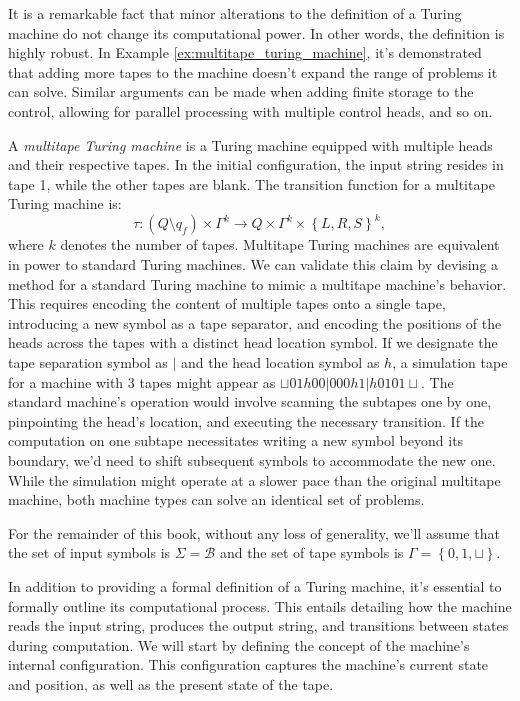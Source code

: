 It is a remarkable fact that minor alterations to the definition of a Turing machine do not change its computational power. In other words, the definition is highly robust. In Example \ref{ex:multitape_turing_machine}, it's demonstrated that adding more tapes to the machine doesn't expand the range of problems it can solve. Similar arguments can be made when adding finite storage to the control, allowing for parallel processing with multiple control heads, and so on.

\begin{example}
\label{ex:multitape_turing_machine}
A \emph{multitape Turing machine} is a Turing machine equipped with multiple heads and their respective tapes. In the initial configuration, the input string resides in tape 1, while the other tapes are blank. The transition function for a multitape Turing machine is:
\[
\tau:\left(Q \setminus q_{f} \right) \times \Gamma^k \rightarrow  Q \times \Gamma^k \times \left\{L,R,S\right\}^k,
\]
where $k$ denotes the number of tapes. Multitape Turing machines are equivalent in power to standard Turing machines. We can validate this claim by devising a method for a standard Turing machine to mimic a multitape machine's behavior. This requires encoding the content of multiple tapes onto a single tape, introducing a new symbol as a tape separator, and encoding the positions of the heads across the tapes with a distinct head location symbol. If we designate the tape separation symbol as $|$ and the head location symbol as $h$, a simulation tape for a machine with 3 tapes might appear as $\sqcup01h00|000h1|h0101\sqcup$. The standard machine's operation would involve scanning the subtapes one by one, pinpointing the head's location, and executing the necessary transition. If the computation on one subtape necessitates writing a new symbol beyond its boundary, we'd need to shift subsequent symbols to accommodate the new one. While the simulation might operate at a slower pace than the original multitape machine, both machine types can solve an identical set of problems.
\end{example}

For the remainder of this book, without any loss of generality, we'll assume that the set of input symbols is $\Sigma = \mathcal{B}$ and the set of tape symbols is $\Gamma = \left\{0, 1, \sqcup \right\}$.

In addition to providing a formal definition of a Turing machine, it's essential to formally outline its computational process. This entails detailing how the machine reads the input string, produces the output string, and transitions between states during computation. We will start by defining the concept of the machine's internal configuration. This configuration captures the machine's current state and position, as well as the present state of the tape.

